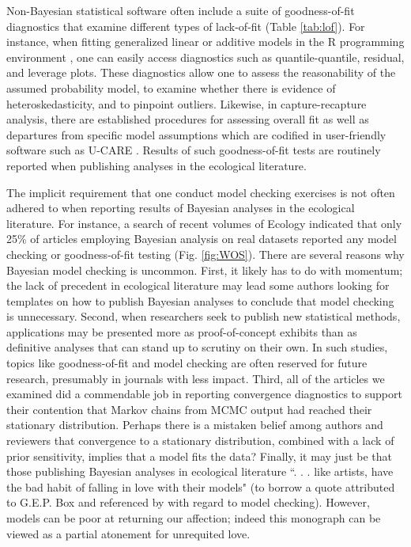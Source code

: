 \documentclass[12pt,english]{article}
\begin{document}
\begin{spacing}{1.9}
Non-Bayesian statistical software often include a suite of goodness-of-fit diagnostics that examine different types of lack-of-fit (Table \ref{tab:lof}).  For instance, when fitting generalized linear \citep{McCullaghNelder1989} or additive \citep{Wood2006} models in the R programming environment \citep{RTeam2015}, one can easily access diagnostics such as quantile-quantile, residual, and leverage plots.  These diagnostics allow one to assess the reasonability of the assumed probability model, to examine whether there is evidence of heteroskedasticity, and to pinpoint outliers.  Likewise, in capture-recapture analysis, there are established procedures for assessing overall fit as well as departures from specific model assumptions which are codified in user-friendly software such as U-CARE \citep{ChoquetEtAl2009}.  Results of such goodness-of-fit tests are routinely reported when publishing analyses in the ecological literature.

The implicit requirement that one conduct model checking exercises is not often adhered to when reporting results of Bayesian analyses in the ecological literature.  For instance, a search of recent volumes of Ecology indicated that only 25\% of articles employing Bayesian analysis on real datasets reported any model checking or goodness-of-fit testing (Fig. \ref{fig:WOS}).  There are several reasons why Bayesian model checking is uncommon.  First, it likely has to do with momentum; the lack of precedent in ecological literature may lead some authors looking for templates on how to publish Bayesian analyses to conclude that model checking is unnecessary.  Second, when researchers seek to publish new statistical methods, applications may be presented more as proof-of-concept exhibits than as definitive analyses that can stand up to scrutiny on their own. In such studies, topics like goodness-of-fit and model checking are often reserved for future research, presumably in journals with less impact.  Third, all of the articles we examined did a commendable job in reporting convergence diagnostics to support their contention that Markov chains from MCMC output had reached their stationary distribution.  Perhaps there is a mistaken belief among authors and reviewers that convergence to a stationary distribution, combined with a lack of prior sensitivity, implies that a model fits the data?  Finally, it may just be that those publishing Bayesian analyses in ecological literature ``. . . like artists, have the bad habit of falling in love with their models" (to borrow a quote attributed to G.E.P. Box and referenced by \citet{LinkBarker2010} with regard to model checking).  However, models can be poor at returning our affection; indeed this monograph can be viewed as a partial atonement for unrequited love.


\end{spacing}
\end{document}
